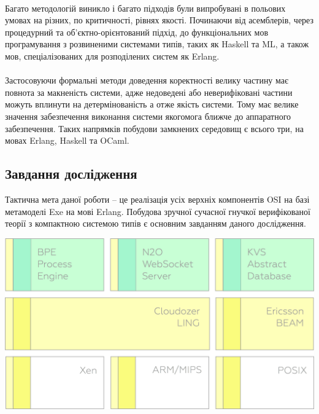 \documentclass[11pt,oneside]{article}
\begin{document}
   \paragraph{}
   Багато методологій виникло і багато підходів були випробувані в польових умовах на різних, по критичності, рівнях якості.
   Починаючи від асемблерів, через процедурний та об’єктно-орієнтований підхід, до функціональних мов програмування
   з розвиненими системами типів, таких як Haskell та ML, а також мов, спеціалізованих для розподілених систем як Erlang.

   \paragraph{}
   Застосовуючи формальні методи доведення коректності велику частину має повнота за макненість системи,
   адже недоведені або неверифіковані частини можуть вплинути на детермінованість а отже якість системи.
   Тому має велике значення забезпечення виконання системи якогомога ближче до аппаратного забезпечення.
   Таких напрямків побудови замкнених середовищ є всього три, на мовах Erlang, Haskell та OCaml.

\newpage
\subsection{Завдання дослідження}
\vspace{0.5cm}
   Тактична мета даної роботи -- це
   реалізація усіх верхніх компонентів OSI на базі метамоделі Exe на мові Erlang.
   Побудова зручної сучасної гнучкої верифікованої теорії
   з компактною системою типів є основним завданням даного дослідження.

   \begin{center}
   \vspace{0.5cm}
   \includegraphics[scale=0.15]{img/exe-res}
   \end{center}
\end{document}
